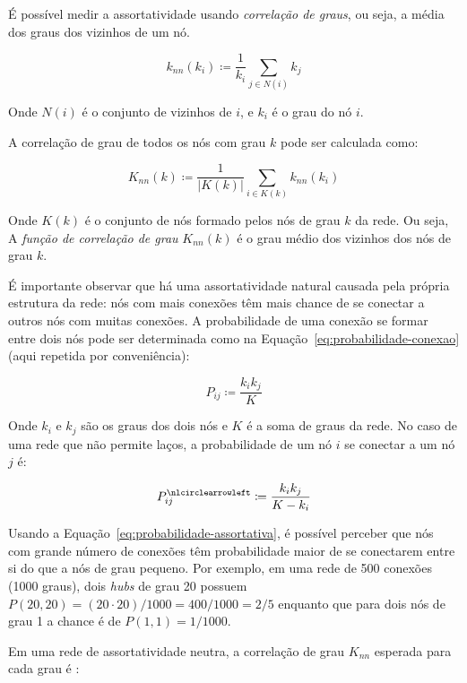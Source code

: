 \documentclass[12pt,a4paper,final]{article}
\newcommand{\defn}{\coloneqq} %
\newcommand{\noloop}[1]{#1^\nlcirclearrowleft} %
\begin{document}
É possível medir a assortatividade usando \textit{correlação de graus}, ou seja, a média dos graus dos vizinhos de um nó.

\begin{equation}
k_\textit{nn}(k_i) \defn \frac{1}{k_i} \sum_{j \in N(i)} k_j
\end{equation}

Onde $N(i)$ é o conjunto de vizinhos de $i$, e $k_i$ é o grau do nó $i$.

A correlação de grau de todos os nós com grau $k$ pode ser calculada como:

\begin{equation}
K_\textit{nn}(k) \defn \frac{1}{|K(k)|} \sum_{i \in K(k)} k_\textit{nn}(k_i)
\end{equation}

Onde $K(k)$ é o conjunto de nós formado pelos nós de grau $k$ da rede. Ou seja, A \textit{função de correlação de grau} $K_\textit{nn}(k)$ é o grau médio dos vizinhos dos nós de grau $k$.

É importante observar que há uma assortatividade natural causada pela própria estrutura da rede: nós com mais conexões têm mais chance de se conectar a outros nós com muitas conexões. A probabilidade de uma conexão se formar entre dois nós pode ser determinada como na Equação~\ref{eq:probabilidade-conexao} (aqui repetida por conveniência):

\begin{equation} \label{eq:probabilidade-assortativa}
P_{ij} \defn \frac{k_i k_j}{K}
\end{equation}

Onde $k_i$ e $k_j$ são os graus dos dois nós e $K$ é a soma de graus da rede. No caso de uma rede que não permite laços, a probabilidade de um nó $i$ se conectar a um nó $j$ é:~

\begin{equation}
\noloop{P}_{ij} \defn \frac{k_i k_j}{K - k_i}
\end{equation}

Usando a Equação~\ref{eq:probabilidade-assortativa}, é possível perceber que nós com grande número de conexões têm probabilidade maior de se conectarem entre si do que a nós de grau pequeno. Por exemplo, em uma rede de 500 conexões (1000 graus), dois \textit{hubs} de grau 20 possuem $P(20, 20) = (20 \cdot 20) / 1000 = 400 / 1000 = 2 / 5$ enquanto que para dois nós de grau 1 a chance é de $P(1, 1) = 1 / 1000$.

Em uma rede de assortatividade neutra, a correlação de grau $K_\textit{nn}$ esperada para cada grau é \cite{Barabasi2016-rn}:
\end{document}
